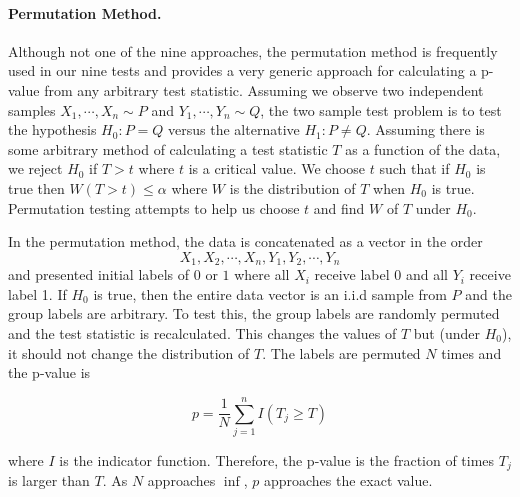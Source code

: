 \documentclass[12pt]{article}
\begin{document}
\paragraph{Permutation Method.} Although not one of the nine approaches, the permutation method is frequently used in our nine tests and provides a very generic approach for calculating a p-value from any arbitrary test statistic. Assuming we observe two independent samples $X_{1}, \cdots, X_{n} \sim P$ and $Y_{1}, \cdots, Y_{n} \sim Q$, the two sample test problem is to test the hypothesis $H_{0} : P = Q$ versus the alternative $H_{1} : P \neq Q$. Assuming there is some arbitrary method of calculating a test statistic $T$ as a function of the data, we reject $H_{0}$ if $T > t$ where $t$ is a critical value. We choose $t$ such that if $H_{0}$ is true then $W(T > t) \leq \alpha$ where $W$ is the distribution of $T$ when $H_{0}$ is true. Permutation testing attempts to help us choose $t$ and find $W$ of $T$ under $H_{0}$. 

In the permutation method, the data is concatenated as a vector in the order \[X_{1}, X_{2}, \cdots, X_{n}, Y_{1}, Y_{2}, \cdots, Y_{n}\] and presented initial labels of $0$ or $1$ where all $X_{i}$ receive label 0 and all $Y_{i}$ receive label 1. If $H_{0}$ is true, then the entire data vector is an i.i.d sample from $P$ and the group labels are arbitrary. To test this, the group labels are randomly permuted and the test statistic is recalculated. This changes the values of $T$ but (under $H_{0}$), it should not change the distribution of $T$. The labels are permuted $N$ times and the p-value is

\[ p = \frac{1}{N}\sum^{n}_{j=1} I(T_{j} \geq T) \]

where $I$ is the indicator function. Therefore, the p-value is the fraction of times $T_{j}$ is larger than $T$. As $N$ approaches $\inf$, $p$ approaches the exact value.
\end{document}
